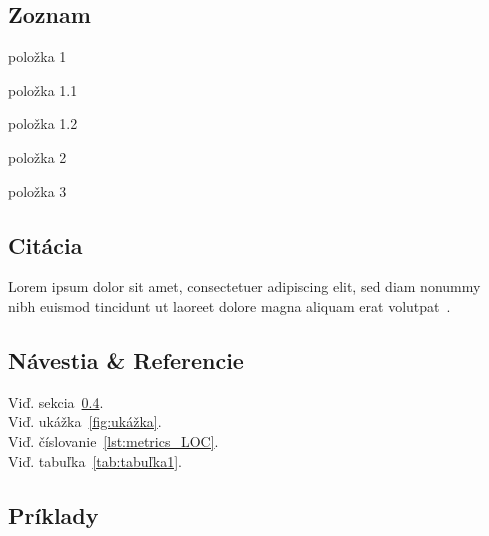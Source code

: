 \subsection{Zoznam}
\begin{my_itemize}
	\item {položka 1}
	\begin{my_itemize}
		\item {položka 1.1}
		\item {položka 1.2}
	\end{my_itemize}
	\item {položka 2}
	\item {položka 3}
\end{my_itemize}
\subsection{Citácia}
Lorem ipsum dolor sit amet, consectetuer adipiscing elit, sed diam nonummy nibh euismod tincidunt ut laoreet dolore magna aliquam erat volutpat~\cite{1}.

\subsection{Návestia \& Referencie}
Viď. sekcia~\ref{sec:Príklady}.\\
Viď. ukážka~\ref{fig:ukážka}.\\
Viď. číslovanie~\ref{lst:metrics_LOC}.\\
Viď. tabuľka~\ref{tab:tabuľka1}.

\subsection{Príklady}
\label{sec:Príklady}

